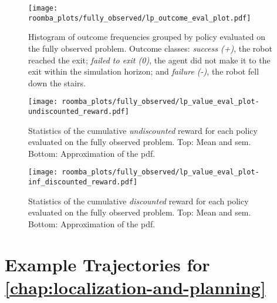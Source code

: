 \begin{appendix}
\begin{figure}[htpb]
  \centering
  \texttt{[image: roomba\_plots/fully\_observed/lp\_outcome\_eval\_plot.pdf]}
\caption{Histogram of outcome frequencies grouped by policy evaluated on the
         fully observed problem. Outcome classes: \emph{success (+)}, the robot
         reached the exit; \emph{failed to exit (0)}, the agent did not make it to the
         exit within the simulation horizon; and \emph{failure (-)}, the robot fell
         down the stairs.}
	\label{fig:lp_outcome_fo}
\end{figure}

\begin{figure}[htpb]
  \centering
  \texttt{[image: roomba\_plots/fully\_observed/lp\_value\_eval\_plot-undiscounted\_reward.pdf]}
  \caption{Statistics of the cumulative \emph{undiscounted} reward for each
           policy evaluated on the fully observed problem. Top: Mean and \acf{sem}.
           Bottom: Approximation of the \acf{pdf}.}
  \label{fig:lp_eval_undiscounted_fo}
\end{figure}

\begin{figure}[htpb]
  \centering
  \texttt{[image: roomba\_plots/fully\_observed/lp\_value\_eval\_plot-inf\_discounted\_reward.pdf]}
  \caption{Statistics of the cumulative \emph{discounted} reward for each
           policy evaluated on the fully observed problem. Top: Mean and \acf{sem}.
           Bottom: Approximation of the \acf{pdf}.}
  \label{fig:lp_eval_infdiscounted_fo}
\end{figure}

\clearpage
\section{Example Trajectories for \cref{chap:localization-and-planning}}


\end{appendix}

